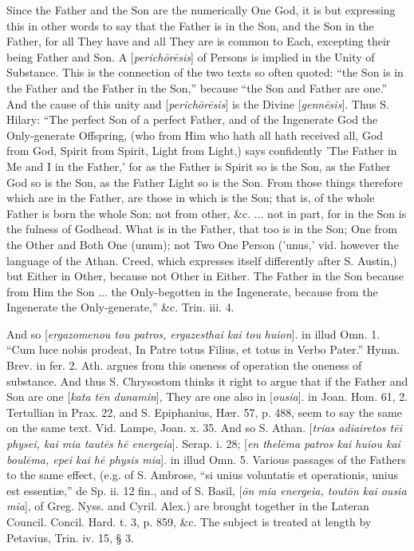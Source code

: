 Since the Father and the Son are the numerically
One God, it is but expressing this in other words to say that the
Father is in the Son, and the Son in the Father, for all They have and
all They are is common to Each, excepting their being Father and Son.
A [\emph{perich\={o}r\={e}sis}] of Persons is implied in the
Unity of Substance. This is the connection of the two texts so often
quoted: ``the Son is in the Father and the Father in the Son,'' because ``the
Son and Father are one.'' And the cause of this unity and [\emph{perich\={o}r\={e}sis}]
is the Divine [\emph{genn\={e}sis}]. Thus S. Hilary: ``The perfect
Son of a perfect Father, and of the Ingenerate God the Only-generate
Offspring, (who from Him who hath all hath received all, God from God,
Spirit from Spirit, Light from Light,) says confidently 'The Father in
Me and I in the Father,' for as the Father is Spirit so is the Son, as
the Father God so is the Son, as the Father Light so is the Son. From
those things therefore which are in the Father, are those in which is
the Son; that is, of the whole Father is born the whole Son; not from
other, \&c. ... not in part, for in the Son is the fulness of
Godhead. What is in the Father, that too is in the Son; One from the
Other and Both One (unum); not Two One Person ('unus,' vid. however
the language of the Athan. Creed, which expresses itself differently
after S. Austin,) but Either in Other, because not Other in Either.
The Father in the Son because from Him the Son ... the Only-begotten
in the Ingenerate, because from the Ingenerate the Only-generate,''
\&c. Trin. iii. 4.

And so [\emph{ergazomenou tou patros, ergazesthai
kai tou} \emph{huion}]. in illud Omn. 1. ``Cum luce nobis
prodeat, In Patre totus Filius, et totus in Verbo Pater.'' Hymn. Brev.
in fer. 2. Ath. argues from this oneness of operation the oneness of
substance. And thus S. Chrysostom thinks it right to argue that if the
Father and Son are one [\emph{kata t\={e}n dunamin}], They are one
also in [\emph{ousia}]. in Joan. Hom. 61, 2. Tertullian in Prax. 22,
and S. Epiphanius, Hær. 57, p. 488, seem to say the same on the same
text. Vid. Lampe, Joan. x. 35. And so S. Athan. [\emph{trias adiairetos t\={e}i
physei, kai mia taut\={e}s h\={e} energeia}]. Serap. i. 28; [\emph{en
thel\={e}ma patros kai huiou kai boul\={e}ma, epei kai h\={e}
physis mia}]. in illud Omn. 5. Various passages of the Fathers to
the same effect, (e.g. of S. Ambrose, ``si unius voluntatis et
operationis, unius est essentiæ,'' de Sp. ii. 12 fin., and of S.
Basil, [\emph{\={o}n mia energeia, tout\={o}n kai ousia mia}],
of Greg. Nyss. and Cyril. Alex.) are brought together in the Lateran
Council. Concil. Hard. t. 3, p. 859, \&c. The subject is treated at
length by Petavius, Trin. iv. 15, § 3.

